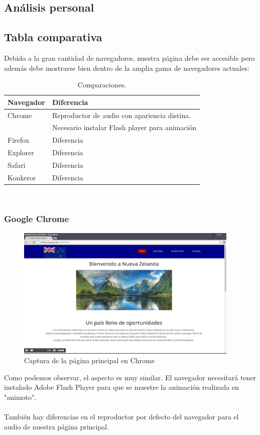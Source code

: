 \subsection{Análisis personal}
\subsection{Tabla comparativa}
Debido a la gran cantidad de navegadores, nuestra página debe ser accesible pero además debe mostrarse bien dentro de la amplia gama de navegadores actuales:\\
\begin{table}[htbp]
	\begin{center}
		\begin{tabular}{|l|l|}
			\hline
			Navegador & Diferencia \\
			\hline \hline
			Chrome & Reproductor de audio con apariencia distina. \\ & Necesario instalar Flash player para animación \\ \hline
			Firefox & Diferencia \\ \hline
			Explorer & Diferencia \\ \hline
			Safari & Diferencia \\ \hline
			Konkeror & Diferencia \\ \hline
		\end{tabular}
		\caption{Comparaciones.}
		\label{tabla:sencilla}
	\end{center}
\end{table}\\
\subsubsection{Google Chrome}
\begin{figure}[h]
	\centering
	\includegraphics[width=0.95\textwidth]{./Fotos/chrome-capture.png}
	\caption{Captura de la página principal en Chrome}
	\label{fig: ejemplo}
\end{figure}
Como podemos observar, el aspecto es muy similar. El navegador necesitará tener instalado Adobe Flash Player para que se muestre la animación realizada en "animoto". \\ \\ También hay diferencias en el reproductor por defecto del navegador para el audio de nuestra página principal.
